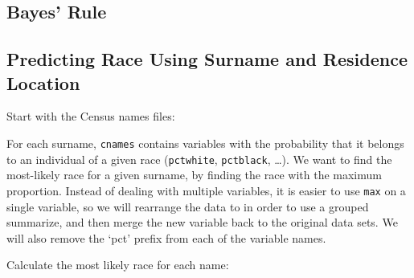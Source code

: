 \documentclass[]{book}
\newenvironment{Shaded}{\begin{snugshade}}{\end{snugshade}}
\newcommand{\CommentTok}[1]{\textcolor[rgb]{0.56,0.35,0.01}{\textit{#1}}}
\newcommand{\DataTypeTok}[1]{\textcolor[rgb]{0.13,0.29,0.53}{#1}}
\newcommand{\KeywordTok}[1]{\textcolor[rgb]{0.13,0.29,0.53}{\textbf{#1}}}
\newcommand{\NormalTok}[1]{#1}
\newcommand{\StringTok}[1]{\textcolor[rgb]{0.31,0.60,0.02}{#1}}
\theoremstyle{definition}
\theoremstyle{definition}
\theoremstyle{definition}
\theoremstyle{remark}
\begin{document}
\hypertarget{bayes-rule}{%
\subsection{Bayes' Rule}\label{bayes-rule}}

\hypertarget{predicting-race-using-surname-and-residence-location}{%
\subsection{Predicting Race Using Surname and Residence
Location}\label{predicting-race-using-surname-and-residence-location}}

Start with the Census names files:

\begin{Shaded}
\end{Shaded}

For each surname, \texttt{cnames} contains variables with the
probability that it belongs to an individual of a given race
(\texttt{pctwhite}, \texttt{pctblack}, \ldots{}). We want to find the
most-likely race for a given surname, by finding the race with the
maximum proportion. Instead of dealing with multiple variables, it is
easier to use \texttt{max} on a single variable, so we will rearrange
the data to in order to use a grouped summarize, and then merge the new
variable back to the original data sets. We will also remove the `pct'
prefix from each of the variable names.

Calculate the most likely race for each name:
\end{document}
